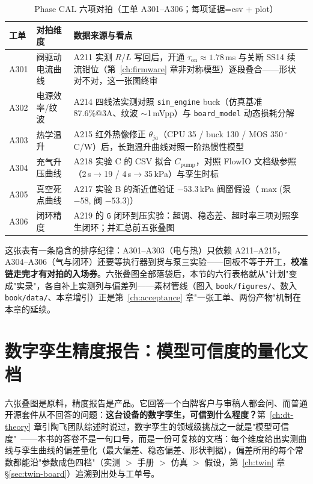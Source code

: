 \begin{table}[htbp]
  \centering
  \caption{Phase CAL 六项对拍（工单 A301--A306；每项证据=csv + plot）}
  \label{tab:product-cal}
  \begin{tabular}{llp{6.8cm}}
    \toprule
    工单 & 对拍维度 & 数据来源与看点 \\
    \midrule
    A301 & 阀驱动电流曲线 & A211 实测 $R/L$ 写回后，开通 $\tau_\text{on}\approx1.78$\,ms 与关断 SS14 续流钳位（第~\ref{ch:firmware} 章非对称模型）逐段叠合——形状对不对，这一张图终审 \\
    A302 & 电源效率/纹波 & A214 四线法实测对照 \texttt{sim\_engine} buck（仿真基准 87.6\%@3A、纹波 $\sim$1\,mVpp）与 \texttt{board\_model} 动态损耗分解 \\
    A303 & 热学温升 & A215 红外热像修正 $\theta_{ja}$（CPU 35 / buck 130 / MOS 350\,$^\circ$C/W）后，长跑温升曲线对照一阶热惯性模型 \\
    A304 & 充气升压曲线 & A218 实验 C 的 CSV 拟合 $C_\text{pump}$，对照 FlowIO 文档级参照（2\,s$\to$19 / 4\,s$\to$35\,kPa）与孪生时标 \\
    A305 & 真空死点曲线 & A217 实验 B 的渐近值验证 $-53.3$\,kPa 阀窗假设（$\max$(泵 $-58$, 阀 $-53.3$)） \\
    A306 & 闭环精度 & A219 的 \texttt{G} 闭环到压实验：超调、稳态差、超时率三项对照孪生闭环；并汇总前五张叠图 \\
    \bottomrule
  \end{tabular}
\end{table}

这张表有一条隐含的排序纪律：A301--A303（电与热）只依赖 A211--A215，A304--A306（气与闭环）还要等执行器到货与泵三实验——回板不等于开工，\textbf{校准链走完才有对拍的入场券}。六张叠图全部落袋后，本节的六行表格就从"计划"变成"实录"，各自补上实测列与偏差列——素材管线（图入 \texttt{book/figures/}、数入 \texttt{book/data/}、本章增引）正是第~\ref{ch:acceptance} 章"一张工单、两份产物"机制在本章的延续。

\section{数字孪生精度报告：模型可信度的量化文档}
\label{sec:product-report}

六张叠图是原料，精度报告是产品。它回答一个白牌客户与审稿人都会问、而普通开源套件从不回答的问题：\textbf{这台设备的数字孪生，可信到什么程度？}第~\ref{ch:dt-theory} 章引陶飞团队综述时说过，数字孪生的领域级挑战之一就是"模型可信度"~\cite{Tao2019}——本书的答卷不是一句口号，而是一份可复核的文档：每个维度给出实测曲线与孪生曲线的偏差量化（最大偏差、稳态偏差、形状判据），偏差所用的每个常数都能沿"参数成色四档"（实测 $>$ 手册 $>$ 仿真 $>$ 假设，第~\ref{ch:twin} 章 \S\ref{sec:twin-board}）追溯到出处与工单号。


